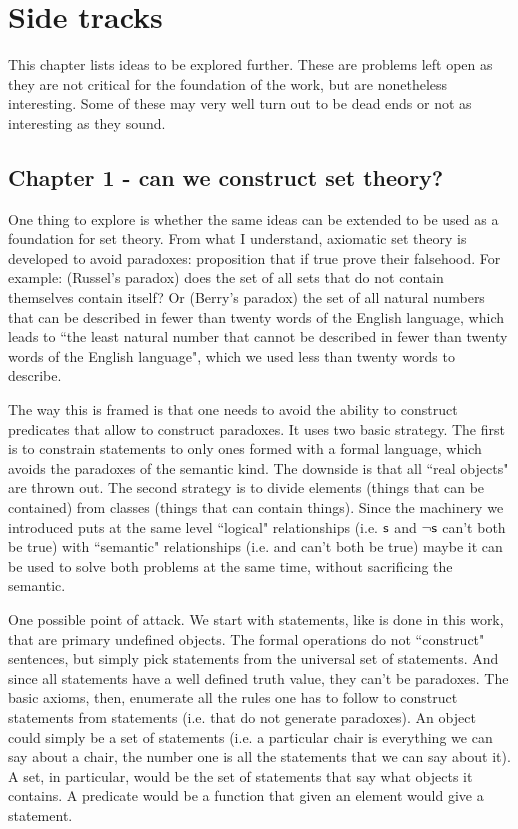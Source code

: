 \documentclass[11pt,letterpaper,fleqn]{memoir} %
\begin{document}
\section{Side tracks}

This chapter lists ideas to be explored further. These are problems left open as they are not critical for the foundation of the work, but are nonetheless interesting. Some of these may very well turn out to be dead ends or not as interesting as they sound.

\subsection{Chapter 1 - can we construct set theory?}

One thing to explore is whether the same ideas can be extended to be used as a foundation for set theory. From what I understand, axiomatic set theory is developed to avoid paradoxes: proposition that if true prove their falsehood. For example: (Russel's paradox) does the set of all sets that do not contain themselves contain itself? Or (Berry's paradox) the set of all natural numbers that can be described in fewer than twenty words of the English language, which leads to ``the least natural number that cannot be described in fewer than twenty words of the English language", which we used less than twenty words to describe.

The way this is framed is that one needs to avoid the ability to construct predicates that allow to construct paradoxes. It uses two basic strategy. The first is to constrain statements to only ones formed with a formal language, which avoids the paradoxes of the semantic kind. The downside is that all ``real objects" are thrown out. The second strategy is to divide elements (things that can be contained) from classes (things that can contain things). Since the machinery we introduced puts at the same level ``logical" relationships (i.e. $\mathsf{s}$ and $\neg\mathsf{s}$ can't both be true) with ``semantic" relationships (i.e.  and  can't both be true) maybe it can be used to solve both problems at the same time, without sacrificing the semantic.

One possible point of attack. We start with statements, like is done in this work, that are primary undefined objects. The formal operations do not ``construct" sentences, but simply pick statements from the universal set of statements. And since all statements have a well defined truth value, they can't be paradoxes. The basic axioms, then, enumerate all the rules one has to follow to construct statements from statements (i.e. that do not generate paradoxes). An object could simply be a set of statements (i.e. a particular chair is everything we can say about a chair, the number one is all the statements that we can say about it). A set, in particular, would be the set of statements that say what objects it contains. A predicate would be a function that given an element would give a statement. 
\end{document}
